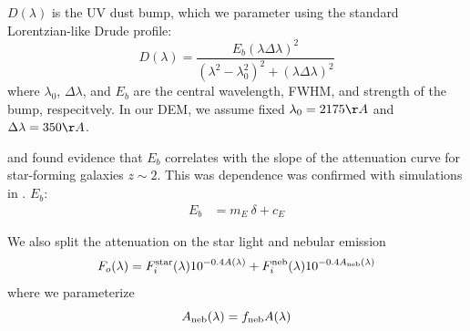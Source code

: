 $D(\lambda)$ is the UV dust bump, which we
parameter using the standard Lorentzian-like Drude profile:
\begin{equation}
    D(\lambda) = \frac{E_b(\lambda \Delta \lambda)^2}{(\lambda^2 -
    \lambda_0^2)^2 + (\lambda \Delta \lambda)^2}
\end{equation}
where $\lambda_0$, $\Delta \lambda$, and $E_b$ are the central wavelength,
FWHM, and strength of the bump, respecitvely. In our DEM, we assume fixed 
$\lambda_0 = 2175 \AA$ and $\Delta \lambda = 350\AA$. 

\cite{kriek2013} and \cite{tress2018} found evidence that $E_b$ correlates with
the slope of the attenuation curve for star-forming galaxies $z\sim2$. This was
dependence was confirmed with simulations in \cite{naranyanan2018}. $E_b$: 
\begin{align}
    E_b &= m_E~\delta + c_E
\end{align}

We also split the attenuation on the star light and nebular emission 
\begin{equation} 
    F_o (\lambda) = F^{\rm star}_i (\lambda) 10^{-0.4 A(\lambda)} + F^{\rm
    neb}_i (\lambda) 10^{-0.4 A_{\rm neb}(\lambda)}
\end{equation}
where we parameterize
\begin{equation}
    A_{\rm neb}(\lambda) = f_{\rm neb}  A(\lambda) 
\end{equation} 


